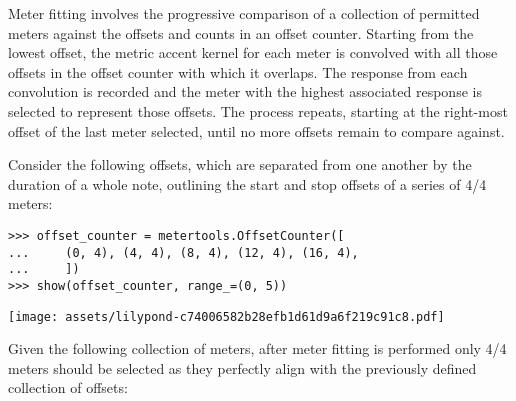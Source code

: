 Meter fitting involves the progressive comparison of a collection of permitted
meters against the offsets and counts in an offset counter. Starting from the
lowest offset, the metric accent kernel for each meter is convolved with all
those offsets in the offset counter with which it overlaps. The response from
each convolution is recorded and the meter with the highest associated response
is selected to represent those offsets. The process repeats, starting at the
right-most offset of the last meter selected, until no more offsets remain to
compare against.

Consider the following offsets, which are separated from one another by the
duration of a whole note, outlining the start and stop offsets of a series of
4/4 meters:

\begin{comment}
<abjad>
offset_counter = metertools.OffsetCounter([
    (0, 4), (4, 4), (8, 4), (12, 4), (16, 4),
    ])
show(offset_counter, range_=(0, 5))
</abjad>
\end{comment}

\begin{singlespacing}
\vspace{-0.5\baselineskip}
\begin{lstlisting}
>>> offset_counter = metertools.OffsetCounter([
...     (0, 4), (4, 4), (8, 4), (12, 4), (16, 4),
...     ])
>>> show(offset_counter, range_=(0, 5))
\end{lstlisting}
\noindent\texttt{[image: assets/lilypond-c74006582b28efb1d61d9a6f219c91c8.pdf]}
\end{singlespacing}

\noindent Given the following collection of meters, after meter fitting is
performed only 4/4 meters should be selected as they perfectly align with
the previously defined collection of offsets:

\begin{comment}
<abjad>
permitted_meters = metertools.MeterInventory([(3, 4), (4, 4), (5, 4)])
show(permitted_meters, range_=(0, 5))
fitted_meters = metertools.Meter.fit_meters_to_expr(
    expr=offset_counter,
    meters=permitted_meters,
    )
show(fitted_meters, range_=(0, 5))
</abjad>
\end{comment}

